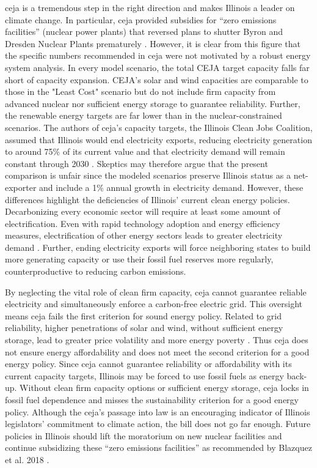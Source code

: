 \gls{ceja} is a tremendous step in the right direction and makes Illinois a leader
on climate change. In particular, \gls{ceja} provided subsidies for ``zero
emissions facilities'' (nuclear power plants) that reversed plans to shutter Byron
and Dresden Nuclear Plants prematurely \cite{harmon_climate_2021,brown_two_2021}.
However, it is clear from this figure that the specific numbers recommended in
\gls{ceja} were not motivated by a robust energy system analysis. In every model
scenario, the total CEJA target capacity falls far short of capacity expansion.
CEJA's solar and wind capacities are comparable to those
in the "Least Cost" scenario but do not include firm capacity from
advanced nuclear nor sufficient energy storage to guarantee reliability.  Further, the
renewable energy targets are far lower than in the nuclear-constrained scenarios.
The authors of \gls{ceja}'s capacity targets, the Illinois Clean Jobs Coalition,
assumed that Illinois would end electricity exports, reducing electricity generation
to around 75\% of its current value and that electricity demand will remain constant
through 2030 \cite{the_accelerate_group_clean_2019}. Skeptics may therefore argue
that the present comparison is unfair since the modeled scenarios preserve Illinois
status as a net-exporter and include a 1\% annual growth in electricity demand.
However, these differences highlight the deficiencies of Illinois' current
clean energy policies. Decarbonizing every economic sector will require
at least some amount of electrification. Even with rapid technology adoption and
energy efficiency measures, electrification of other energy sectors leads to greater
electricity demand \cite{mai_electrification_2018}. Further, ending electricity
exports will force neighboring states to build more generating capacity or use
their fossil fuel reserves more regularly, counterproductive to reducing
carbon emissions.

By neglecting the vital role of clean firm capacity, \gls{ceja} cannot guarantee
reliable electricity and simultaneously enforce a carbon-free electric grid. This oversight
means \gls{ceja} fails the first criterion for sound energy policy. Related to grid
reliability, higher penetrations of solar and wind, without sufficient energy
storage, lead to greater price volatility \cite{winkler_impact_2016, blazquez_renewable_2018}
and more energy poverty \cite{henry_how_2021}. Thus \gls{ceja} does not ensure energy
affordability and does not meet the second criterion for a good energy policy. Since
\gls{ceja} cannot guarantee reliability or affordability with its current capacity
targets, Illinois may be forced to use fossil fuels as energy back-up. Without
clean firm capacity options or sufficient energy storage, \gls{ceja} locks in
fossil fuel dependence and misses the sustainability criterion for a good energy policy.
Although the \gls{ceja}'s passage into law is an encouraging indicator of Illinois
legislators' commitment to climate action, the bill does not go far enough. Future
policies in Illinois should lift the moratorium on new nuclear facilities and
continue subsidizing these ``zero emissions facilities'' as recommended by
Blazquez et al. 2018 \cite{blazquez_renewable_2018}.

